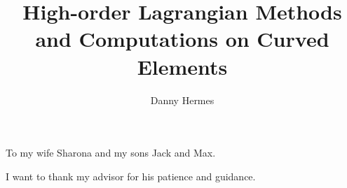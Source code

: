 \documentclass{ucbthesis}
\theoremstyle{definition}
\begin{document}

\title{High-order Lagrangian Methods and Computations on Curved Elements}
\author{Danny Hermes}

\maketitle
\approvalpage
\copyrightpage



\begin{frontmatter}

\begin{dedication}
\null\vfil
\begin{center}
To my wife Sharona and my sons Jack and Max.
\end{center}
\vfil\null
\end{dedication}

\tableofcontents
\clearpage
\listoffigures
\clearpage
\listoftables

\begin{acknowledgements}
I want to thank my advisor for his patience and guidance.
\end{acknowledgements}

\end{frontmatter}

\pagestyle{headings}









\appendix



\end{document}
